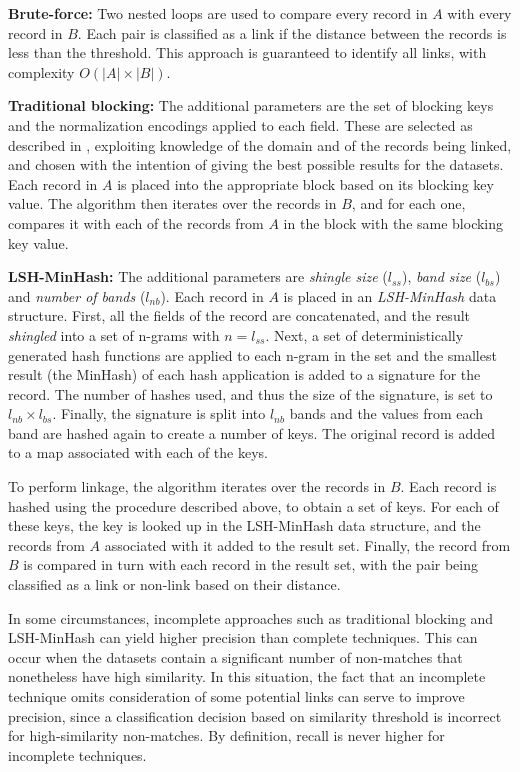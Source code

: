 \documentclass{llncs}
\begin{document}
\textbf{Brute-force:}
Two nested loops are used to compare every record in $A$ with every
record in $B$. Each pair is classified as a link if the distance between
the records is less than the threshold. This approach is guaranteed to
identify all links, with complexity $ O(|A| \times |B|) $.

\textbf{Traditional blocking:}
The additional parameters are the set of blocking keys and the
normalization encodings applied to each field. These are selected as
described in \cite{Chr12b}, exploiting knowledge of the domain and of
the records being linked, and chosen with the intention of giving the
best possible results for the datasets. Each record in $A$ is placed
into the appropriate block based on its blocking key value. The
algorithm then iterates over the records in $B$, and for each one,
compares it with each of the records from $A$ in the block with the same
blocking key value.

\textbf{LSH-MinHash:}
The additional parameters are \emph{shingle size} ($l_{ss}$), \emph{band
size} ($l_{bs}$) and \emph{number of bands} ($l_{nb}$). Each record in
$A$ is placed in an \emph{LSH-MinHash} data structure. First, all the
fields of the record are concatenated, and the result \emph{shingled}
into a set of n-grams with $n = l_{ss}$. Next, a set of
deterministically generated hash functions are applied to each n-gram in
the set and the smallest result (the MinHash) of each hash application
is added to a signature for the record. The number of hashes used, and
thus the size of the signature, is set to $l_{nb} \times l_{bs}$.
Finally, the signature is split into $l_{nb}$ bands and the values from
each band are hashed again to create a number of keys. The original
record is added to a map associated with each of the keys. 

To perform linkage, the algorithm iterates over the records in $B$. Each
record is hashed using the procedure described above, to obtain a set of
keys. For each of these keys, the key is looked up in the LSH-MinHash
data structure, and the records from $A$ associated with it added to the
result set. Finally, the record from $B$ is compared in turn with each
record in the result set, with the pair being classified as a link or
non-link based on their distance.

In some circumstances, incomplete approaches such as traditional
blocking and LSH-MinHash can yield higher precision than complete
techniques. This can occur when the datasets contain a significant
number of non-matches that nonetheless have high similarity. In this
situation, the fact that an incomplete technique omits consideration of
some potential links can serve to improve precision, since a
classification decision based on similarity threshold is incorrect for
high-similarity non-matches. By definition, recall is never higher for
incomplete techniques.
\end{document}
